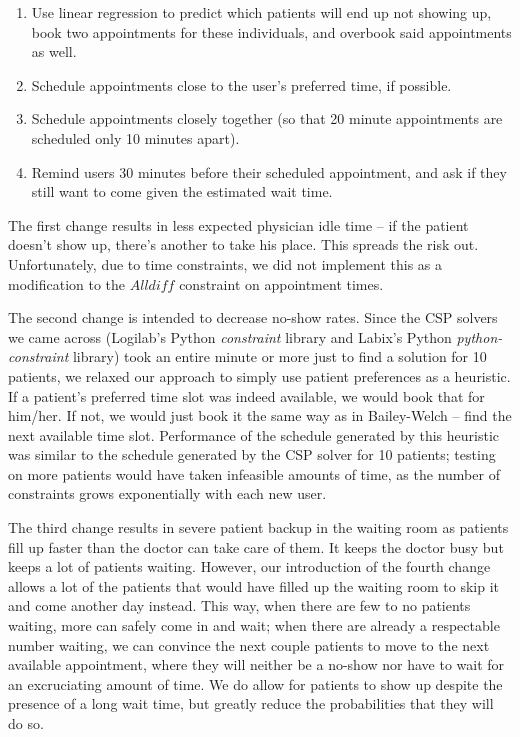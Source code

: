 \documentclass{article} %
\begin{document}
\begin{enumerate}
\item Use linear regression to predict which patients will end up not showing up, book two appointments for these individuals, and overbook said appointments as well.
\item Schedule appointments close to the user's preferred time, if possible.
\item Schedule appointments closely together (so that 20 minute appointments are scheduled only 10 minutes apart).
\item Remind users 30 minutes before their scheduled appointment, and ask if they still want to come given the estimated wait time.
\end{enumerate}

The first change results in less expected physician idle time -- if the patient doesn't show up, there's another to take his place. This spreads the risk out. Unfortunately, due to time constraints, we did not implement this as a modification to the $Alldiff$ constraint on appointment times. 

The second change is intended to decrease no-show rates. Since the CSP solvers we came across (Logilab's Python \emph{constraint} library and Labix's Python \emph{python-constraint} library) took an entire minute or more just to find a solution for 10 patients, we relaxed our approach to simply use patient preferences as a heuristic. If a patient's preferred time slot was indeed available, we would book that for him/her. If not, we would just book it the same way as in Bailey-Welch -- find the next available time slot. Performance of the schedule generated by this heuristic was similar to the schedule generated by the CSP solver for 10 patients; testing on more patients would have taken infeasible amounts of time, as the number of constraints grows exponentially with each new user.

The third change results in severe patient backup in the waiting room as patients fill up faster than the doctor can take care of them. It keeps the doctor busy but keeps a lot of patients waiting. However, our introduction of the fourth change allows a lot of the patients that would have filled up the waiting room to skip it and come another day instead. This way, when there are few to no patients waiting, more can safely come in and wait; when there are already a respectable number waiting, we can convince the next couple patients to move to the next available appointment, where they will neither be a no-show nor have to wait for an excruciating amount of time. We do allow for patients to show up despite the presence of a long wait time, but greatly reduce the probabilities that they will do so.
\end{document}
